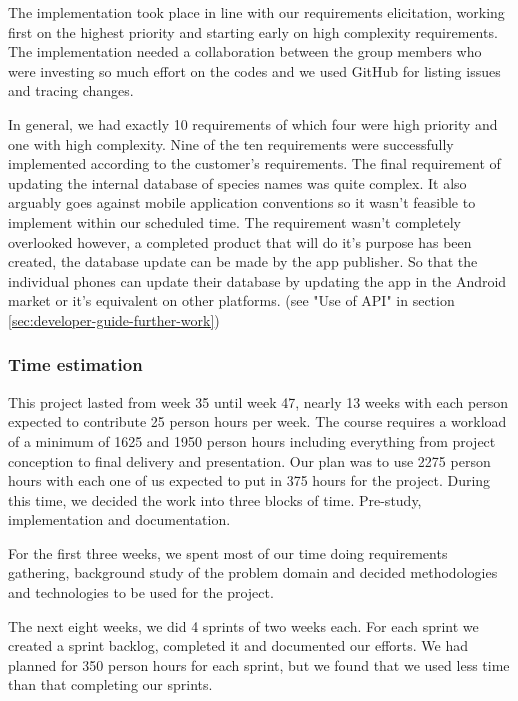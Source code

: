 The implementation took place in line with our requirements elicitation, working
first on the highest priority and starting early on high complexity
requirements.  The implementation needed a collaboration between the group
members who were investing so much effort on the codes and we used GitHub for
listing issues and tracing changes.

In general, we had exactly 10 requirements of which four were high priority and
one with high complexity.  Nine of the ten requirements were successfully
implemented according to the customer's requirements.  The final requirement of
updating the internal database of species names was quite complex.
It also arguably goes against mobile application conventions so it wasn't feasible
to implement within our scheduled time.
The requirement wasn't completely overlooked however, a completed product that will
do it's purpose has been created, the database update can be made by the app publisher.
So that the individual phones can update their database by updating the app in the
Android market or it's equivalent on other platforms.
(see "Use of API" in section \ref{sec:developer-guide-further-work})

	\subsubsection{Time estimation}
  This project lasted from week 35 until week 47, nearly 13 weeks with each person expected to contribute 25 person hours per week. The course requires a workload of a minimum of 1625 and 1950 person hours including everything from project conception to final delivery and presentation. Our plan was to use 2275 person hours with each one of us expected to put in 375 hours for the project. During this time, we decided the work into three blocks of time. Pre-study, implementation and documentation.

  For the first three weeks, we spent most of our time doing
  requirements gathering, background study of the problem domain and decided
  methodologies and technologies to be used for the project.

  The next eight weeks, we did 4 sprints of two weeks each. For each sprint we
  created a sprint backlog, completed it and documented our efforts. We had
  planned for 350 person hours for each sprint, but we found that we used less
  time than that completing our sprints.

